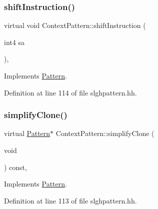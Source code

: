 \subsubsection{\texorpdfstring{shiftInstruction()}{shiftInstruction()}}
{\footnotesize\ttfamily virtual void Context\+Pattern\+::shift\+Instruction (\begin{DoxyParamCaption}\item[{int4}]{sa }\end{DoxyParamCaption})\hspace{0.3cm}{\ttfamily [inline]}, {\ttfamily [virtual]}}



Implements \mbox{\hyperlink{class_pattern_a8a84c1487128e33cdc27c2069eb4c02a}{Pattern}}.



Definition at line 114 of file slghpattern.\+hh.

\mbox{\label{class_context_pattern_a42838644f963d9b251c0d221c20c8116}} 
\subsubsection{\texorpdfstring{simplifyClone()}{simplifyClone()}}
{\footnotesize\ttfamily virtual \mbox{\hyperlink{class_pattern}{Pattern}}$\ast$ Context\+Pattern\+::simplify\+Clone (\begin{DoxyParamCaption}\item[{void}]{ }\end{DoxyParamCaption}) const\hspace{0.3cm}{\ttfamily [inline]}, {\ttfamily [virtual]}}



Implements \mbox{\hyperlink{class_pattern_a9c2c1383d7f836f8af237a03e463d94d}{Pattern}}.



Definition at line 113 of file slghpattern.\+hh.

